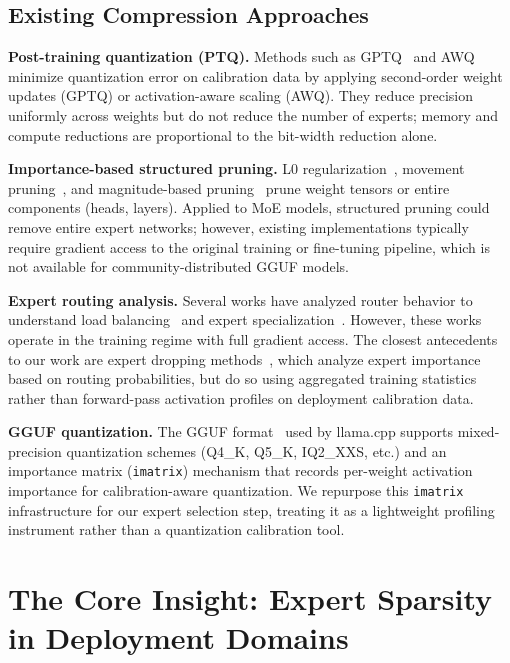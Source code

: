 \documentclass[final]{article}
\begin{document}
\subsection{Existing Compression Approaches}

\textbf{Post-training quantization (PTQ).} Methods such as GPTQ~\cite{frantar2022gptq} and AWQ~\cite{lin2024awq} minimize quantization error on calibration data by applying second-order weight updates (GPTQ) or activation-aware scaling (AWQ). They reduce precision uniformly across weights but do not reduce the number of experts; memory and compute reductions are proportional to the bit-width reduction alone.

\textbf{Importance-based structured pruning.} L0 regularization~\cite{louizos2018learning}, movement pruning~\cite{sanh2020movement}, and magnitude-based pruning~\cite{han2015learning} prune weight tensors or entire components (heads, layers). Applied to MoE models, structured pruning could remove entire expert networks; however, existing implementations typically require gradient access to the original training or fine-tuning pipeline, which is not available for community-distributed GGUF models.

\textbf{Expert routing analysis.} Several works have analyzed router behavior to understand load balancing~\cite{lepikhin2021gshard} and expert specialization~\cite{fedus2022switch}. However, these works operate in the training regime with full gradient access. The closest antecedents to our work are expert dropping methods~\cite{chen2022task}, which analyze expert importance based on routing probabilities, but do so using aggregated training statistics rather than forward-pass activation profiles on deployment calibration data.

\textbf{GGUF quantization.} The GGUF format~\cite{llama_cpp} used by llama.cpp supports mixed-precision quantization schemes (Q4\_K, Q5\_K, IQ2\_XXS, etc.) and an importance matrix (\texttt{imatrix}) mechanism that records per-weight activation importance for calibration-aware quantization. We repurpose this \texttt{imatrix} infrastructure for our expert selection step, treating it as a lightweight profiling instrument rather than a quantization calibration tool.

\section{The Core Insight: Expert Sparsity in Deployment Domains}
\label{sec:insight}
\end{document}
